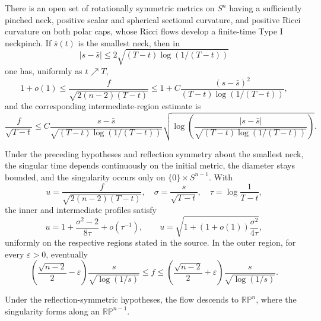\begin{theorem}
\label{thm:chow-ii-appd-neckpinch-existence}
There is an open set of rotationally symmetric metrics on $S^n$ having a
sufficiently pinched neck, positive scalar and spherical sectional curvature,
and positive Ricci curvature on both polar caps, whose Ricci flows develop a
finite-time Type I neckpinch. If $\bar s(t)$ is the smallest neck, then in
\[
 |s-\bar s|\leq2\sqrt{(T-t)\log(1/(T-t))}
\]
one has, uniformly as $t\nearrow T$,
\[
 1+o(1)\leq\frac{f}{\sqrt{2(n-2)(T-t)}}
 \leq1+C\frac{(s-\bar s)^2}{(T-t)\log(1/(T-t))},
\]
and the corresponding intermediate-region estimate is
\[
 \frac f{\sqrt{T-t}}\leq
 C\frac{s-\bar s}{\sqrt{(T-t)\log(1/(T-t))}}
 \sqrt{\log\left(\frac{|s-\bar s|}
 {\sqrt{(T-t)\log(1/(T-t))}}\right)}.
\]
\end{theorem}

\begin{theorem}
\label{thm:chow-ii-appd-neckpinch-asymptotics}
Under the preceding hypotheses and reflection symmetry about the smallest
neck, the singular time depends continuously on the initial metric, the
diameter stays bounded, and the singularity occurs only on
$\{0\}\times S^{n-1}$. With
\[
 u=\frac f{\sqrt{2(n-2)(T-t)}},\quad
 \sigma=\frac s{\sqrt{T-t}},\quad \tau=\log\frac1{T-t},
\]
the inner and intermediate profiles satisfy
\[
 u=1+\frac{\sigma^2-2}{8\tau}+o(\tau^{-1}),\qquad
 u=\sqrt{1+(1+o(1))\frac{\sigma^2}{4\tau}},
\]
uniformly on the respective regions stated in the source. In the outer
region, for every $\varepsilon>0$, eventually
\[
 \left(\frac{\sqrt{n-2}}2-\varepsilon\right)
 \frac{s}{\sqrt{\log(1/s)}}\leq f\leq
 \left(\frac{\sqrt{n-2}}2+\varepsilon\right)
 \frac{s}{\sqrt{\log(1/s)}}.
\]
\end{theorem}

\begin{remark}
\label{rem:chow-ii-appd-projective-neckpinch}
Under the reflection-symmetric hypotheses, the flow descends to
$\mathbb{RP}^n$, where the singularity forms along an
$\mathbb{RP}^{n-1}$.
\end{remark}

